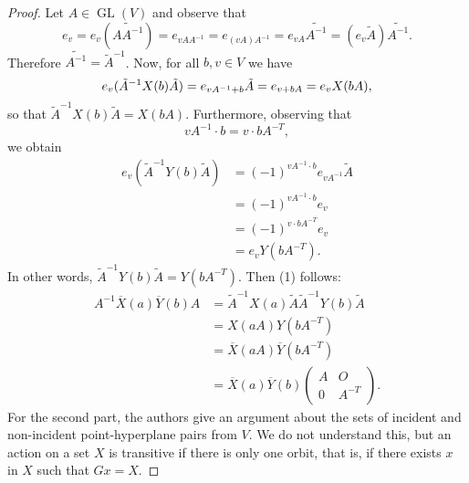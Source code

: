 \documentclass[a4paper]{article}
\DeclareMathOperator{\GL}{GL}
\begin{document}
  \begin{proof}
    Let $A \in \GL(V)$ and observe that
    \[
      e_v 
      = e_v \left( \widetilde{AA^{-1}} \right) 
      = e_{v AA^{-1}}
      = e_{(vA) A^{-1}}
      = e_{vA} \widetilde{A^{-1}} 
      = \left( e_v \tilde A \right) \widetilde{A^{-1}}.
    \] 
    Therefore $\widetilde{A^{-1}} = \tilde A^{-1}$.  Now,
    for all $b,v \in V$ we have
    \begin{equation*}
      e_v(\tilde A^{-1}X(b)\tilde A)
      = e_{vA^{-1}+b}\tilde A \\
      = e_{v+bA}  \\
      = e_v X(bA),
    \end{equation*}
    so that $\tilde A^{-1}X(b) \tilde A = X(bA)$.
    Furthermore, observing that
    \[
      vA^{-1} \cdot b
      = v \cdot b A^{-T},
    \] 
    we obtain
    \begin{align*}
      e_v \left( \tilde A^{-1} Y(b) \tilde A \right) 
      &= (-1)^{vA^{-1} \cdot b} e_{vA^{-1}} \tilde A \\
      &= (-1)^{vA^{-1} \cdot b} e_{v} \\
      &= (-1)^{v \cdot bA^{-T}} e_v \\
      &= e_v Y(bA^{-T}).
    \end{align*}
    In other words, $\tilde A^{-1}Y(b)\tilde A =
    Y(bA^{-T})$. Then (1) follows:
    \begin{align*}
       A^{-1} \overline{X}(a)\overline{Y}(b) A
      &= \tilde A^{-1} X(a)\tilde A \tilde A^{-1}Y(b) \tilde
      A \\
      &= X(aA) Y(bA^{-T}) \\
      &= \overline{X}(aA)\overline{Y}(bA^{-T}) \\
      &= \overline{X}(a) \overline{Y}(b) \begin{pmatrix} A &
      O \\ 0 & A^{-T}\end{pmatrix}.
    \end{align*}
    For the second part, the authors give an argument about
    the sets of incident and non-incident point-hyperplane
    pairs from $V$. We do not understand this, but an action
    on a set $X$ is transitive if there is only one orbit,
    that is, if there exists $x$ in $X$ such that $Gx = X$.
  \end{proof}
\end{document}
